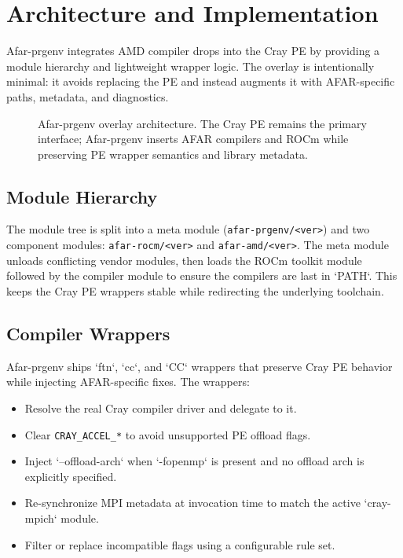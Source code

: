 \section{Architecture and Implementation}
\label{sec:implementation}
Afar-prgenv integrates AMD compiler drops into the Cray PE by providing a
module hierarchy and lightweight wrapper logic. The overlay is intentionally
minimal: it avoids replacing the PE and instead augments it with AFAR-specific
paths, metadata, and diagnostics.

\begin{figure}[t]
  \centering
  
  \caption{Afar-prgenv overlay architecture. The Cray PE remains the primary
  interface; Afar-prgenv inserts AFAR compilers and ROCm while preserving PE
  wrapper semantics and library metadata.}
  \label{fig:architecture}
\end{figure}

\subsection{Module Hierarchy}
\label{sec:modules}
The module tree is split into a meta module (\texttt{afar-prgenv/<ver>}) and two
component modules: \texttt{afar-rocm/\allowbreak <ver>} and
\texttt{afar-amd/\allowbreak <ver>}. The meta module
unloads conflicting vendor modules, then loads the ROCm toolkit module followed
by the compiler module to ensure the compilers are last in `PATH`. This keeps
the Cray PE wrappers stable while redirecting the underlying toolchain.

\subsection{Compiler Wrappers}
\label{sec:wrappers}
Afar-prgenv ships `ftn`, `cc`, and `CC` wrappers that preserve Cray PE behavior
while injecting AFAR-specific fixes. The wrappers:
\begin{itemize}
  \item Resolve the real Cray compiler driver and delegate to it.
  \item Clear \texttt{CRAY\_ACCEL\_*} to avoid unsupported PE offload flags.
  \item Inject `--offload-arch` when `-fopenmp` is present and no offload arch
  is explicitly specified.
  \item Re-synchronize MPI metadata at invocation time to match the active
  `cray-mpich` module.
  \item Filter or replace incompatible flags using a configurable rule set.
\end{itemize}

